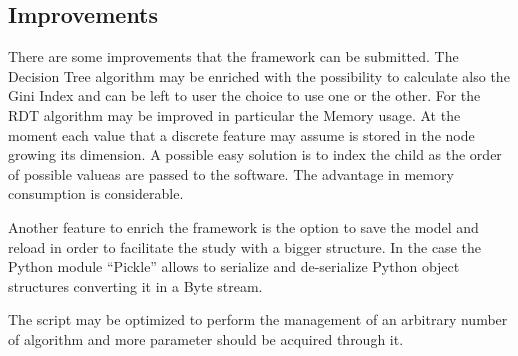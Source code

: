 \documentclass{acm_proc_article-sp-sigmod07}
\begin{document}
\subsection{Improvements}
There are some improvements that the framework can be submitted.
The Decision Tree algorithm may be enriched with the possibility to
calculate also the Gini Index and can be left to user the choice to use 
one or the other. 
For the RDT algorithm may be improved in particular the Memory usage. At
the moment each value that a discrete feature may assume is stored in the
node growing its dimension. A possible easy solution is to index the child
as the order of possible valueas are passed to the software. The advantage
in memory consumption is considerable.

Another feature to enrich the framework is the option to save the model
and reload in order to facilitate the study with a bigger structure. In
the case the Python module ``Pickle'' allows to serialize and de-serialize
Python object structures converting it in a Byte stream.

The script may be optimized to perform the management of an arbitrary
number of algorithm and more parameter should be acquired through it.


\end{document}
